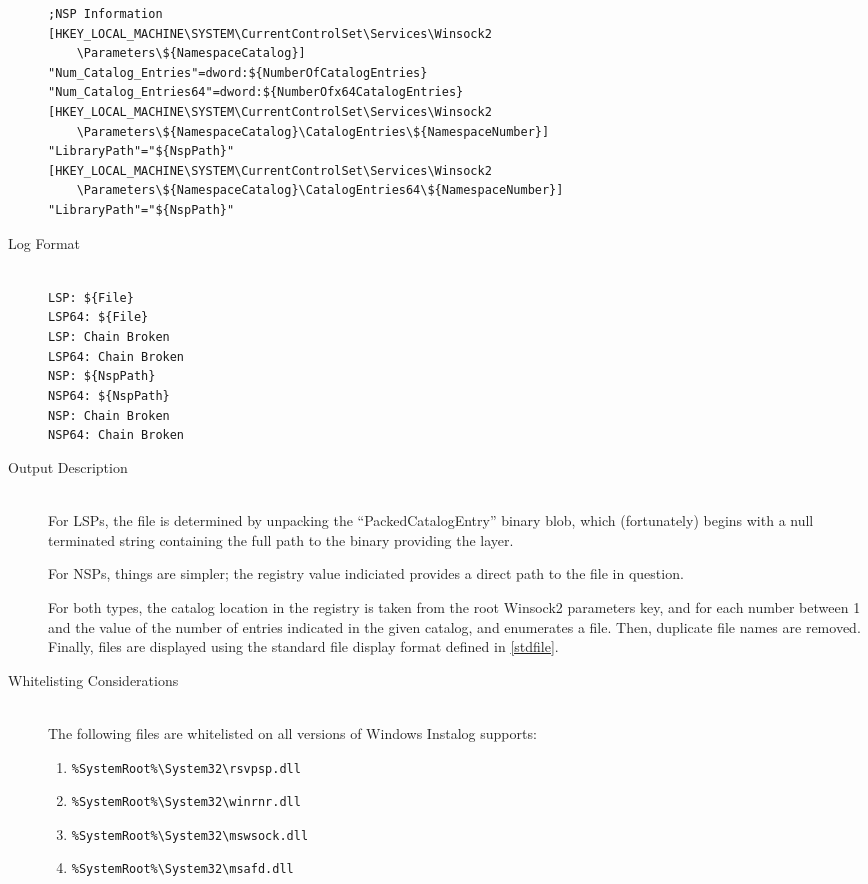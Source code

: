 \begin{description}
\begin{verbatim}
;NSP Information
[HKEY_LOCAL_MACHINE\SYSTEM\CurrentControlSet\Services\Winsock2
    \Parameters\${NamespaceCatalog}]
"Num_Catalog_Entries"=dword:${NumberOfCatalogEntries}
"Num_Catalog_Entries64"=dword:${NumberOfx64CatalogEntries}
[HKEY_LOCAL_MACHINE\SYSTEM\CurrentControlSet\Services\Winsock2
    \Parameters\${NamespaceCatalog}\CatalogEntries\${NamespaceNumber}]
"LibraryPath"="${NspPath}"
[HKEY_LOCAL_MACHINE\SYSTEM\CurrentControlSet\Services\Winsock2
    \Parameters\${NamespaceCatalog}\CatalogEntries64\${NamespaceNumber}]
"LibraryPath"="${NspPath}"
\end{verbatim}
\item[Log Format] \hfill \\
\verb|LSP: ${File}| \\
\verb|LSP64: ${File}| \\
\verb|LSP: Chain Broken| \\
\verb|LSP64: Chain Broken| \\
\verb|NSP: ${NspPath}| \\
\verb|NSP64: ${NspPath}| \\
\verb|NSP: Chain Broken| \\
\verb|NSP64: Chain Broken|
\item[Output Description] \hfill \\
For LSPs, the file is determined by unpacking the ``PackedCatalogEntry'' binary
blob, which (fortunately) begins with a null terminated string containing the
full path to the binary providing the layer.

For NSPs, things are simpler; the registry value indiciated provides a direct
path to the file in question.

For both types, the catalog location in the registry is taken from the root
Winsock2 parameters key, and for each number between 1 and the value of the
number of entries indicated in the given catalog, and enumerates a file. Then,
duplicate file names are removed. Finally, files are displayed using the
standard file display format defined in \ref{stdfile}.
\item[Whitelisting Considerations] \hfill \\
The following files are whitelisted on all versions of Windows Instalog
supports:
\begin{enumerate}
    \item \verb|%SystemRoot%\System32\rsvpsp.dll|
    \item \verb|%SystemRoot%\System32\winrnr.dll|
    \item \verb|%SystemRoot%\System32\mswsock.dll|
    \item \verb|%SystemRoot%\System32\msafd.dll|
\end{enumerate}


\end{description}
